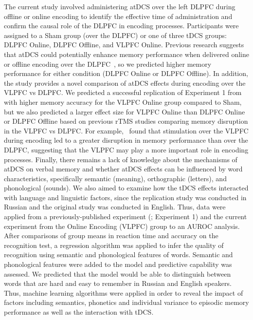 \documentclass[10pt,letterpaper]{article}
\begin{document}
The current study involved administering atDCS over the left DLPFC during offline or online encoding to identify the effective time of administration and confirm the causal role of the DLPFC in encoding processes. Participants were assigned to a Sham group (over the DLPFC) or one of three tDCS groups: DLPFC Online, DLPFC Offline, and VLPFC Online. Previous research suggests that atDCS could potentially enhance memory performance when delivered online or offline encoding over the DLPFC~\cite{sandrini2014noninvasive, lu2015spatiotemporal, pisoni2015guess, balzarotti2016effects, pergolizzi2016transcranial}, so we predicted higher memory performance for either condition (DLPFC Online or DLPFC Offline). In addition, the study provides a novel comparison of atDCS effects during encoding over the VLPFC vs DLPFC. We predicted a successful replication of Experiment 1 from~\cite{medvedeva2019effects} with higher memory accuracy for the VLPFC Online group compared to Sham, but we also predicted a larger effect size for VLPFC Online than DLPFC Online or DLPFC Offline based on previous rTMS studies comparing memory disruption in the VLPFC vs DLPFC. For example,~\cite{blumenfeld2014effects} found that stimulation over the VLPFC during encoding led to a greater disruption in memory performance than over the DLPFC, suggesting that the VLPFC may play a more important role in encoding processes. Finally, there remains a lack of knowledge about the mechanisms of atDCS on verbal memory and whether atDCS effects can be influenced by word characteristics, specifically semantic (meaning), orthographic (letters), and phonological (sounds). We also aimed to examine how the tDCS effects interacted with language and linguistic factors, since the replication study was conducted in Russian and the original study was conducted in English. Thus, data were applied from a previously-published experiment (\cite{medvedeva2019effects}; Experiment 1) and the current experiment from the Online Encoding (VLPFC) group to an AUROC analysis. After comparisons of group means in reaction time and accuracy on the recognition test, a regression algorithm was applied to infer the quality of recognition using semantic and phonological features of words. Semantic and phonological features were added to the model and predictive capability was assessed. We predicted that the model would be able to distinguish between  words that are hard and easy to remember in Russian and English speakers. Thus, machine learning algorithms were applied in order to reveal the impact of factors including semantics, phonetics and individual variance to episodic memory performance as well as the interaction with tDCS.
\end{document}
